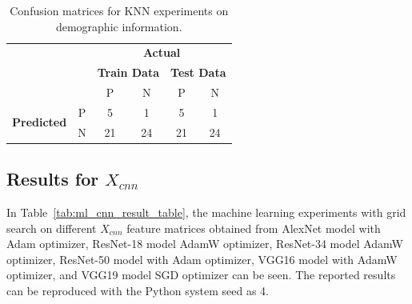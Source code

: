 \begin{table}[!h]
\centering
\caption{Confusion matrices for KNN experiments on demographic information.}
\label{tab:knn_conf_matrix_xinfo}
\begin{tabular}{|cc|c|c|c|c|}
\cline{1-6}
                                                          &   & \multicolumn{4}{c|}{\textbf{Actual}}                                                                                                                                                                                       \\ \cline{3-6} 
                                                          &   & \multicolumn{2}{c|}{\textbf{Train Data}} & \multicolumn{2}{c|}{\textbf{Test Data}} \\ \cline{3-6} 
                                                          &   & \text{\:\:} P \text{\:\:}                                                   & N                                                    & \text{\:} P \text{\:}                                                   & N                                                   \\ \hline
\multicolumn{1}{|c|}{\multirow{2}{*}{\textbf{Predicted}}} & P & 5                                                     & 1                                                    & 5                                                     & 1                                                   \\ \cline{2-6} 
\multicolumn{1}{|c|}{}                                    & N & 21                                                    & 24                                                   & 21                                                    & 24                                                  \\ \hline
\end{tabular}
\end{table}

\subsection{Results for $X_{cnn}$} \label{CH6:results_xcnn}

In Table~\ref{tab:ml_cnn_result_table}, the machine learning experiments with grid search on different $X_{cnn}$ feature matrices obtained from AlexNet model with Adam optimizer, ResNet-18 model AdamW optimizer, ResNet-34 model AdamW optimizer, ResNet-50 model with Adam optimizer, VGG16 model with AdamW optimizer, and VGG19 model SGD optimizer can be seen. The reported results can be reproduced with the Python system seed as 4.


